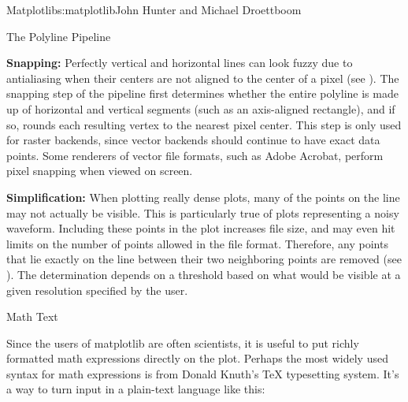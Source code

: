 \begin{aosachapter}{Matplotlib}{s:matplotlib}{John Hunter and Michael Droettboom}
\begin{aosasect1}{The Polyline Pipeline}
\begin{aosaenumerate}
\item \textbf{Snapping:} Perfectly vertical and horizontal lines can
  look fuzzy due to antialiasing when their centers are not aligned to
  the center of a pixel (see
  ).  The snapping step of
  the pipeline first determines whether the entire polyline is made up
  of horizontal and vertical segments (such as an axis-aligned
  rectangle), and if so, rounds each resulting vertex to the nearest
  pixel center.  This step is only used for raster backends, since
  vector backends should continue to have exact data points.  Some
  renderers of vector file formats, such as Adobe Acrobat, perform
  pixel snapping when viewed on screen.


\item \textbf{Simplification:} When plotting really dense plots, many
  of the points on the line may not actually be visible.  This is
  particularly true of plots representing a noisy waveform.  Including
  these points in the plot increases file size, and may even hit
  limits on the number of points allowed in the file format.
  Therefore, any points that lie exactly on the line between their two
  neighboring points are removed (see
  ).  The determination
  depends on a threshold based on what would be visible at a given
  resolution specified by the user.


\end{aosaenumerate}

\end{aosasect1}

\begin{aosasect1}{Math Text}

Since the users of matplotlib are often scientists, it is useful to
put richly formatted math expressions directly on the plot.  Perhaps
the most widely used syntax for math expressions is from Donald
Knuth's TeX typesetting system.  It's a way to turn input in a
plain-text language like this: 


\end{aosasect1}
\end{aosachapter}

